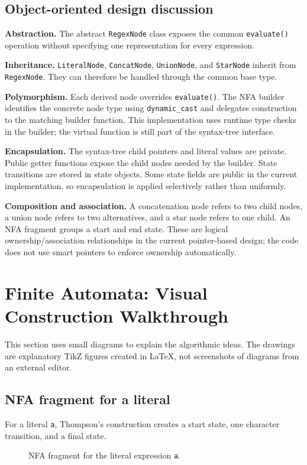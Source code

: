 \documentclass[12pt,a4paper]{report}
\begin{document}
\subsection{Object-oriented design discussion}
\textbf{Abstraction.} The abstract \texttt{RegexNode} class exposes the common \texttt{evaluate()} operation without specifying one representation for every expression. 

\textbf{Inheritance.} \texttt{LiteralNode}, \texttt{ConcatNode}, \texttt{UnionNode}, and \texttt{StarNode} inherit from \texttt{RegexNode}. They can therefore be handled through the common base type.

\textbf{Polymorphism.} Each derived node overrides \texttt{evaluate()}. The NFA builder identifies the concrete node type using \texttt{dynamic\_cast} and delegates construction to the matching builder function. This implementation uses runtime type checks in the builder; the virtual function is still part of the syntax-tree interface.

\textbf{Encapsulation.} The syntax-tree child pointers and literal values are private. Public getter functions expose the child nodes needed by the builder. State transitions are stored in state objects. Some state fields are public in the current implementation, so encapsulation is applied selectively rather than uniformly.

\textbf{Composition and association.} A concatenation node refers to two child nodes, a union node refers to two alternatives, and a star node refers to one child. An NFA fragment groups a start and end state. These are logical ownership/association relationships in the current pointer-based design; the code does not use smart pointers to enforce ownership automatically.

\section{Finite Automata: Visual Construction Walkthrough}
This section uses small diagrams to explain the algorithmic ideas. The drawings are explanatory TikZ figures created in LaTeX, not screenshots of diagrams from an external editor.

\subsection{NFA fragment for a literal}
For a literal \texttt{a}, Thompson's construction creates a start state, one character transition, and a final state.
\begin{figure}[H]
\centering
{}
\caption{NFA fragment for the literal expression \texttt{a}.}
\label{fig:nfa-literal}
\end{figure}
\end{document}
